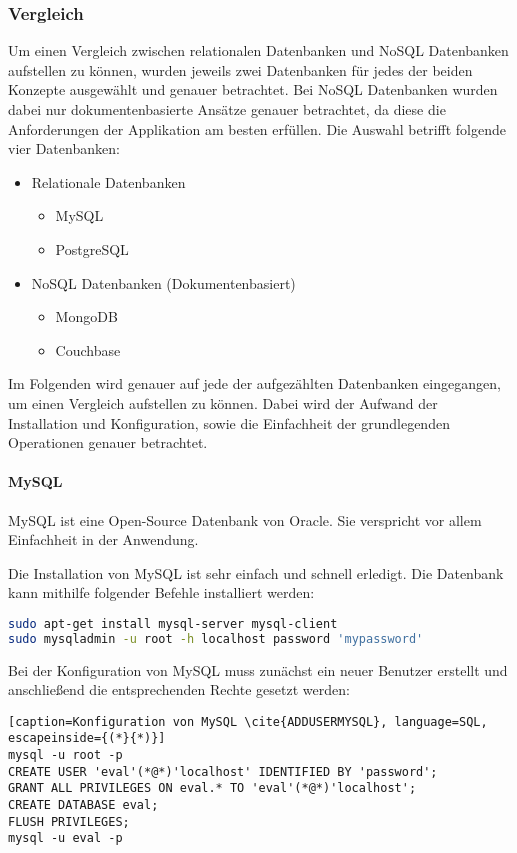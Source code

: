 \newpage

\subsubsection{Vergleich}
Um einen Vergleich zwischen relationalen Datenbanken und NoSQL Datenbanken aufstellen zu können, wurden jeweils zwei Datenbanken für jedes der beiden Konzepte ausgewählt und genauer betrachtet. Bei NoSQL Datenbanken wurden dabei nur dokumentenbasierte Ansätze genauer betrachtet, da diese die Anforderungen der Applikation am besten erfüllen. Die Auswahl betrifft folgende vier Datenbanken:
\begin{itemize}
\item Relationale Datenbanken
\begin{itemize}
\item MySQL
\item PostgreSQL
\end{itemize}
\item NoSQL Datenbanken (Dokumentenbasiert)
\begin{itemize}
\item MongoDB
\item Couchbase
\end{itemize}
\end{itemize}

Im Folgenden wird genauer auf jede der aufgezählten Datenbanken eingegangen, um einen Vergleich aufstellen zu können. Dabei wird der Aufwand der Installation und Konfiguration, sowie die Einfachheit der grundlegenden Operationen genauer betrachtet.

\paragraph{MySQL}
\label{subsubsec:mysql}
MySQL ist eine Open-Source Datenbank von Oracle. Sie verspricht vor allem Einfachheit in der Anwendung.\cite{ABOUTMYSQL}

Die Installation von MySQL ist sehr einfach und schnell erledigt. Die Datenbank kann mithilfe folgender Befehle installiert werden:
\begin{lstlisting}[caption=Installation von MySQL \cite{MYSQLINSTALL}, language=bash]
sudo apt-get install mysql-server mysql-client
sudo mysqladmin -u root -h localhost password 'mypassword'
\end{lstlisting}

\newpage

Bei der Konfiguration von MySQL muss zunächst ein neuer Benutzer erstellt und anschließend die entsprechenden Rechte gesetzt werden:
\begin{lstlisting}[caption=Konfiguration von MySQL \cite{ADDUSERMYSQL}, language=SQL, escapeinside={(*}{*)}]
mysql -u root -p
CREATE USER 'eval'(*@*)'localhost' IDENTIFIED BY 'password';
GRANT ALL PRIVILEGES ON eval.* TO 'eval'(*@*)'localhost';
CREATE DATABASE eval;
FLUSH PRIVILEGES;
mysql -u eval -p
\end{lstlisting}

